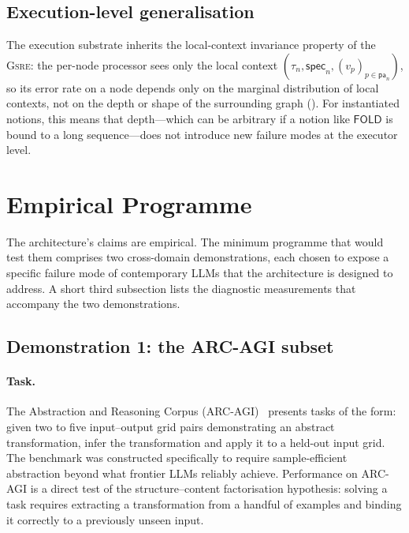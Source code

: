 \documentclass[11pt,a4paper]{article}
\theoremstyle{plain}
\theoremstyle{definition}
\theoremstyle{remark}
\newcommand{\Spec}{\mathsf{spec}}
\newcommand{\Parents}{\mathsf{pa}}
\newcommand{\GSRE}{\textsc{Gsre}}
\begin{document}
\subsection{Execution-level generalisation}

The execution substrate inherits the local-context invariance property of the \GSRE: the per-node processor sees only the local context $(\tau_n, \Spec_n, (v_p)_{p \in \Parents_n})$, so its error rate on a node depends only on the marginal distribution of local contexts, not on the depth or shape of the surrounding graph (). For instantiated notions, this means that depth---which can be arbitrary if a notion like $\mathsf{FOLD}$ is bound to a long sequence---does not introduce new failure modes at the executor level.

\section{Empirical Programme}
\label{sec:empirical}

The architecture's claims are empirical. The minimum programme that would test them comprises two cross-domain demonstrations, each chosen to expose a specific failure mode of contemporary LLMs that the architecture is designed to address. A short third subsection lists the diagnostic measurements that accompany the two demonstrations.

\subsection{Demonstration 1: the ARC-AGI subset}
\label{sec:emp-arc}

\paragraph{Task.}
The Abstraction and Reasoning Corpus (ARC-AGI)~\cite{chollet2019arc, chollet2024onthemeasureofintelligence} presents tasks of the form: given two to five input--output grid pairs demonstrating an abstract transformation, infer the transformation and apply it to a held-out input grid. The benchmark was constructed specifically to require sample-efficient abstraction beyond what frontier LLMs reliably achieve. Performance on ARC-AGI is a direct test of the structure--content factorisation hypothesis: solving a task requires extracting a transformation from a handful of examples and binding it correctly to a previously unseen input.
\end{document}
